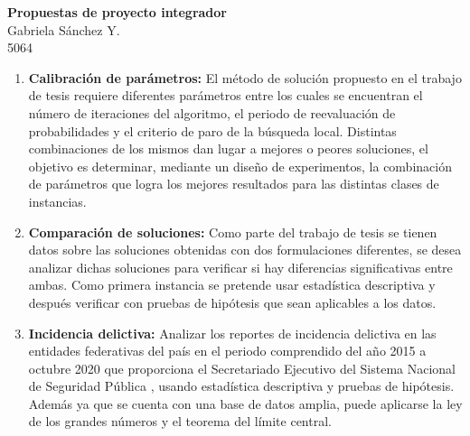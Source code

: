 \documentclass[12pt]{article}
\begin{document}
	\thispagestyle{empty}

	\begin{center}
		{\Large \bf Propuestas de proyecto integrador}\\
		Gabriela S\'anchez Y.\\
		5064
	\end{center}
  
  	\begin{enumerate}
  		\item {\bf Calibración de parámetros:} El método de solución propuesto en el trabajo de tesis requiere diferentes parámetros entre los cuales se encuentran el número de iteraciones del algoritmo, el periodo de reevaluación de probabilidades y el criterio de paro de la búsqueda local. Distintas combinaciones de los mismos dan lugar a mejores o peores soluciones, el objetivo es determinar, mediante un diseño de experimentos, la combinación de parámetros que logra los mejores resultados para las distintas clases de instancias.
  		\item {\bf Comparación de soluciones:} Como parte del trabajo de tesis se tienen datos sobre las soluciones obtenidas con dos formulaciones diferentes, se desea analizar dichas soluciones para verificar si hay diferencias significativas entre ambas. Como primera instancia se pretende usar estadística descriptiva y después verificar con pruebas de hipótesis que sean aplicables a los datos.
  		\item {\bf Incidencia delictiva:} Analizar los reportes de incidencia delictiva en las entidades federativas del país en el periodo comprendido del año 2015 a octubre 2020 que proporciona el Secretariado Ejecutivo del Sistema Nacional de Seguridad Pública \cite{sesnsp}, usando estadística descriptiva y pruebas de hipótesis. Además ya que se cuenta con una base de datos amplia, puede aplicarse la ley de los grandes números y el teorema del límite central.
  	\end{enumerate}
	


\end{document}
